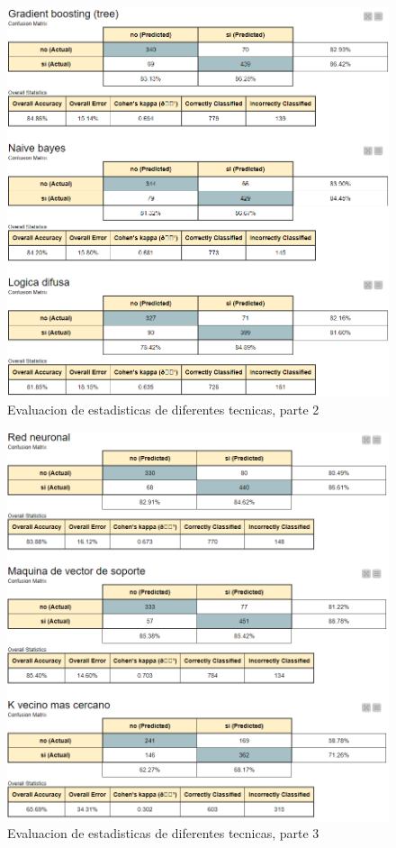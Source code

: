 \documentclass[12pt, letterpaper]{article}
\begin{document}
\begin{figure}
    \centering
    \includegraphics[scale=0.58]{tecnicas2.png}
    \caption{Evaluacion de estadisticas de diferentes tecnicas, parte 2}
    \label{fig:tecnicas2}
\end{figure}

\begin{figure}
    \centering
    \includegraphics[scale=0.58]{tecnicas3.png}
    \caption{Evaluacion de estadisticas de diferentes tecnicas, parte 3}
    \label{fig:tecnicas3}
\end{figure}
\end{document}
